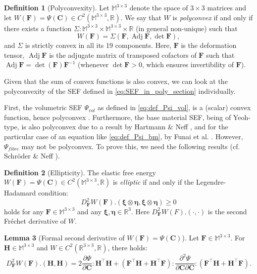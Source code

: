 \documentclass{sfuthesis}
\numberwithin{equation}{section}
\numberwithin{figure}{chapter}
\numberwithin{table}{chapter}
\theoremstyle{definition}
\newtheorem{definition}{Definition}[chapter]
\newtheorem{lemma}[definition]{Lemma}
\def\*#1{{\mathbf{#1}}} %
\newcommand{\pder}[2]{\dfrac{\partial #1}{\partial #2}}
\newcommand{\R}{\mathbb{R}}
\DeclareMathOperator{\Adj}{\mathrm{Adj}}
\begin{document}
\begin{definition}[Polyconvexity]
    Let $\mathbb{M}^{3\times 3}$ denote the space of $3\times 3$ matrices and let $W(\*F) = \Psi(\*C) \in C^2(\mathbb{M}^{3\times 3}, \R)$. We say that $W$ is \textit{polyconvex} if and only if there exists a function $\Sigma:\mathbb{M}^{3\times 3} \times \mathbb{M}^{3\times 3} \times \R$ (in general non-unique) such that
    \begin{equation}
        W(\*F) = \Sigma(\*F, \Adj\*F, \det \*F),
    \end{equation}
    and $\Sigma$ is strictly convex in all its 19 components. Here, $\*F$ is the deformation tensor, $\Adj \*F$ is the adjugate matrix of transposed cofactors of $\*F$ such that $\Adj \*F = \det(\*F) \*F^{-1}$ (whenever $\det \*F > 0$, which ensures invertibility of $\*F$).
\end{definition}
Given that the sum of convex functions is also convex, we can look at the polyconvexity of the SEF defined in \eqref{eq:SEF_in_poly_section} individually. 

First, the volumetric SEF $\Psi_{vol}$ as defined in \eqref{eq:def_Psi_vol}, is a (scalar) convex function, hence polyconvex \cite{Doll2000}. Furthermore, the base material SEF, being of Yeoh-type, is also polyconvex due to a result by Hartmann \& Neff \cite{HartmannNeff2003}, and for the particular case of an equation like \eqref{eq:def_Psi_bm}, by Funai et al. \cite{FunaiEtAl2021}. However, $\Psi_{fibre}$ may not be polyconvex. To prove this, we need the following results (cf. Schr\"{o}der \& Neff \cite{SchroderNeff2003}).

\begin{definition}[Ellipticity] \label{def:def_ellipticity}
    The elastic free energy $W(\*F) = \Psi(\*C) \in C^2(\mathbb{M}^{3\times 3}, \R)$ is \textit{elliptic} if and only if the Legendre-Hadamard condition:
    \begin{equation} \label{eq:ellipticity_cond}
        D_{\*F}^2 W(\*F).(\bm{\xi} \otimes \bm{\eta}, \bm{\xi} \otimes \bm{\eta}) \geq 0
    \end{equation}
    holds for any $\*F \in \mathbb{M}^{3\times 3}$ and any $\bm{\xi},\bm{\eta} \in \R^3$. Here $D^2_{\*F}W(F).(\cdot,\cdot)$ is the second Fr\'echet derivative of $W$.
\end{definition}

\begin{lemma}[Formal second derivative of $W(\*F) = \Psi(\*C)$] 
    Let $\*F \in \mathbb{M}^{3 \times 3}$. For $\*H \in \mathbb{M}^{3\times3}$ and $W \in C^2(\mathbb{R}^{3\times 3},\R)$, there holds:
    \begin{equation} \label{eq:D2W_poly}
        D_{\*F}^2 W(\*F).(\*H, \*H) = 2 \pder{\Psi}{\*C} : \*H^\top \*H + (\*F^\top \*H + \*H^\top \*F) : \dfrac{\partial^2 \Psi}{\partial \*C \partial \*C} : (\*F^\top \*H + \*H^\top \*F).
    \end{equation}
\end{lemma}
\end{document}
